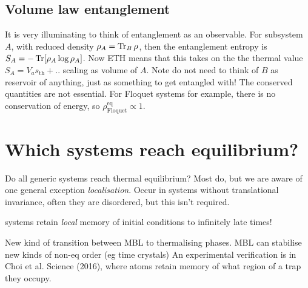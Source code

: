 \documentclass[a4paper]{article}
\begin{document}
\subsection{Volume law entanglement}
It is very illuminating to think of entanglement as an observable. For subsystem
$A$, with reduced density $\rho_A=\operatorname{Tr}_B \rho$, then the entanglement entropy is
$S_A=-\operatorname{Tr} [\rho_A\log \rho_A]$. Now ETH means that this takes on the the
thermal value $S_A= V_a s_\mathrm{th}+..$ scaling as volume of $A$.
Note do not need to think of $B$ as reservoir of anything, just as something to
get entangled with! The conserved quantities are not essential. For Floquet
systems for example, there is no conservation of energy, so
$\rho^\mathrm{eq}_\mathrm{Floquet}\propto 1$. 
\section{Which systems reach equilibrium?}
Do all generic systems reach thermal equilibrium? Most do, but we are aware of
one general exception \emph{localisation}. Occur in systems without
translational invariance, often they are disordered, but this isn't required. 

\begin{definition}
    systems retain \emph{local} memory of initial conditions to infinitely late
    times! 
\end{definition}
New kind of transition between MBL to thermalising phases. MBL can stabilise new
kinds of non-eq order (eg time crystals)
An experimental verification is in Choi et al. Science (2016), where atoms
retain memory of what region of a trap they occupy.
\end{document}
